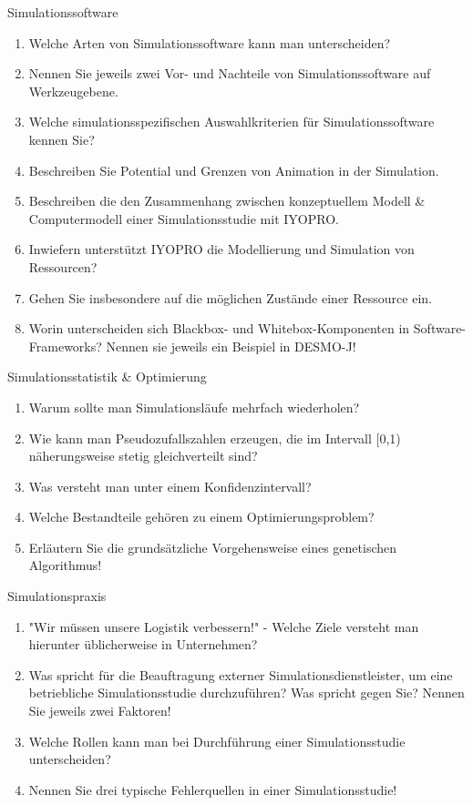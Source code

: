 \documentclass{article}
\begin{document}
\begin{exercise}{Simulationssoftware}
  \begin{enumerate}
    \item Welche Arten von Simulationssoftware kann man unterscheiden?
    \item Nennen Sie jeweils zwei Vor- und Nachteile von Simulationssoftware auf Werkzeugebene.
    \item Welche simulationsspezifischen Auswahlkriterien für Simulationssoftware kennen Sie?
    \item Beschreiben Sie Potential und Grenzen von Animation in der Simulation.
    \item Beschreiben die den Zusammenhang zwischen konzeptuellem Modell \& Computermodell einer Simulationsstudie mit IYOPRO.
    \item Inwiefern unterstützt IYOPRO die Modellierung und Simulation von Ressourcen?
    \item Gehen Sie insbesondere auf die möglichen Zustände einer Ressource ein.
    \item Worin unterscheiden sich Blackbox- und Whitebox-Komponenten in Software-Frameworks? Nennen sie jeweils ein Beispiel in DESMO-J!
  \end{enumerate}
\end{exercise}

\begin{exercise}{Simulationsstatistik \& Optimierung}
  \begin{enumerate}
    \item Warum sollte man Simulationsläufe mehrfach wiederholen?
    \item Wie kann man Pseudozufallszahlen erzeugen, die im Intervall [0,1) näherungsweise stetig gleichverteilt sind?
    \item Was versteht man unter einem Konfidenzintervall?
    \item Welche Bestandteile gehören zu einem Optimierungsproblem?
    \item Erläutern Sie die grundsätzliche Vorgehensweise eines genetischen Algorithmus!
  \end{enumerate}
\end{exercise}

\begin{exercise}{Simulationspraxis}
  \begin{enumerate}
    \item "Wir müssen unsere Logistik verbessern!" - Welche Ziele versteht man hierunter üblicherweise in Unternehmen?
    \item Was spricht für die Beauftragung externer Simulationsdienstleister, um eine betriebliche Simulationsstudie durchzuführen? Was spricht gegen Sie? Nennen Sie jeweils zwei Faktoren!
    \item Welche Rollen kann man bei Durchführung einer Simulationsstudie unterscheiden?
    \item Nennen Sie drei typische Fehlerquellen in einer Simulationsstudie!
  \end{enumerate}
\end{exercise}
\end{document}
